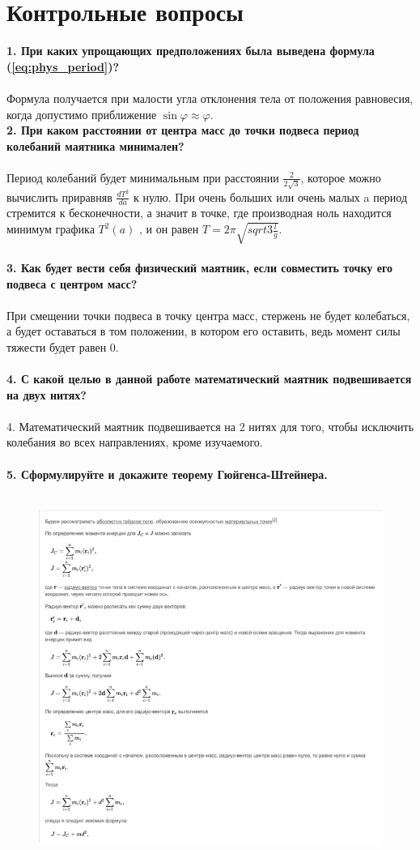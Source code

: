 \documentclass[13pt,a4paper]{article}
\begin{document}
\section{Контрольные вопросы}

\textbf{1. При каких упрощающих предположениях была выведена формула (\ref{eq:phys_period})?}\\
\\
Формула получается при малости угла отклонения тела от положения равновесия, когда допустимо приближение $\sin\varphi\approx\varphi$.\\
\textbf{2. При каком расстоянии от центра масс до точки подвеса период колебаний маятника минимален?}\\
\\
Период колебаний будет минимальным при расстоянии $\frac{2}{2\sqrt{3}}$, которое можно вычислить приравняв $\frac{dT^2}{da}$  к нулю. При очень больших или очень малых a период стремится к бесконечности, а значит в точке, где производная ноль находится минимум графика $T^2(a)$ , и он равен $T=2\pi\sqrt{sqrt{3}\frac{l}{g}}$.\\
\\
\textbf{3. Как будет вести себя физический маятник, если совместить точку его подвеса с центром масс?}\\
\\
При смещении точки подвеса в точку центра масс, стержень не будет колебаться, а будет оставаться в том положении, в котором его оставить, ведь момент силы тяжести будет равен 0.\\
\\
\textbf{4. С какой целью в данной работе математический маятник подвешивается на двух нитях?}\\
\\
4.	Математический маятник подвешивается на 2 нитях для того, чтобы исключить колебания во всех направлениях, кроме изучаемого.\\
\\
\textbf{5. Сформулируйте и докажите теорему Гюйгенса-Штейнера.}\\
\\

\begin{figure}[h!]
	\begin{center}
		\includegraphics[width = 1.3\textwidth]{theorem}
		\label{fig:theorem}
	\end{center}
\end{figure}
\end{document}

